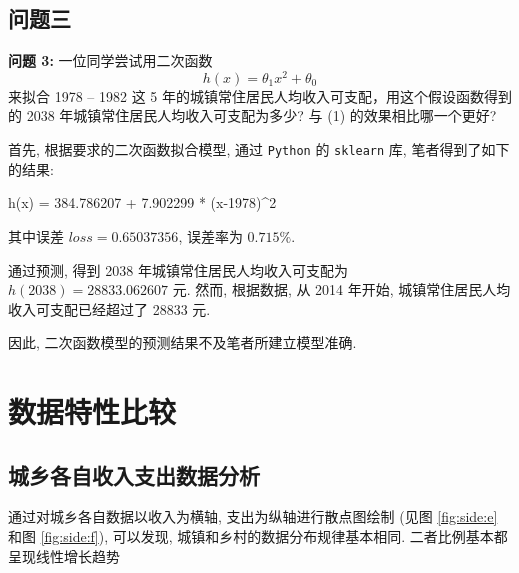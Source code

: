 \documentclass{article}
\begin{document}
\subsection{问题三}

\begin{mdframed}
\fangsong
\textbf{问题 3:} 一位同学尝试用二次函数
\begin{equation}
  \label{eq:2}
  h\left(x\right)=\theta_1 x^2+\theta_0
\end{equation}
来拟合 1978 -- 1982 这 5 年的城镇常住居民人均收入可支配，用这个假设函数得到的 2038 年城镇常住居民人均收入可支配为多少? 与 (1) 的效果相比哪一个更好?
\end{mdframed}

首先, 根据要求的二次函数拟合模型, 通过 \texttt{Python} 的 \texttt{sklearn} 库, 笔者得到了如下的结果:

\begin{eqation*}
  h\left(x\right) = 384.786207 + 7.902299 * \left(x-1978\right)^2
\end{eqation*}

\par 其中误差 $loss = 0.65037356$, 误差率为 $0.715\%$.
\par 通过预测, 得到 2038 年城镇常住居民人均收入可支配为 $h\left(2038\right) = 28833.062607$ 元. 然而, 根据数据, 从 2014 年开始, 城镇常住居民人均收入可支配已经超过了 28833 元.\\
\par 因此, 二次函数模型的预测结果不及笔者所建立模型准确.

\section{数据特性比较}\label{sec:compare}

\subsection{城乡各自收入支出数据分析}

\par 通过对城乡各自数据以收入为横轴, 支出为纵轴进行散点图绘制 (见图 \ref{fig:side:e} 和图 \ref{fig:side:f}), 可以发现, 城镇和乡村的数据分布规律基本相同. 二者比例基本都呈现线性增长趋势\\
\end{document}

